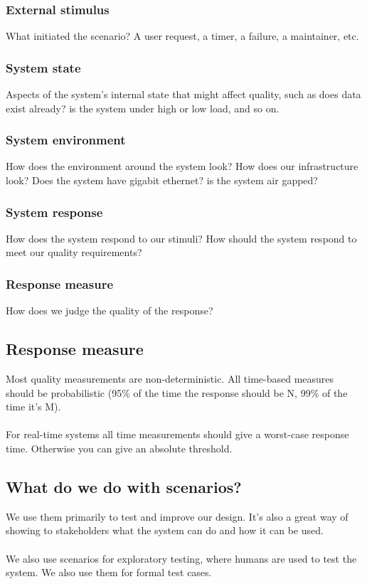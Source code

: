 \subsubsection{External stimulus}
What initiated the scenario? A user request, a timer, a failure, a maintainer, etc.
\subsubsection{System state}
Aspects of the system's internal state that might affect quality, such as does data exist already? is the system under high or low load, and so on.
\subsubsection{System environment}
How does the environment around the system look? How does our infrastructure look? Does the system have gigabit ethernet? is the system air gapped?
\subsubsection{System response}
How does the system respond to our stimuli? How should the system respond to meet our quality requirements?
\subsubsection{Response measure}
How does we judge the quality of the response?

\subsection{Response measure}
Most quality measurements are non-deterministic. All time-based measures should be probabilistic (95\% of the time the response should be N, 99\% of the time it's M).\\
\\
For real-time systems all time measurements should give a worst-case response time. Otherwise you can give an absolute threshold.
\subsection{What do we do with scenarios?}
We use them primarily to test and improve our design. It's also a great way of showing to stakeholders what the system can do and how it can be used.\\
\\
We also use scenarios for exploratory testing, where humans are used to test the system. We also use them for formal test cases.

